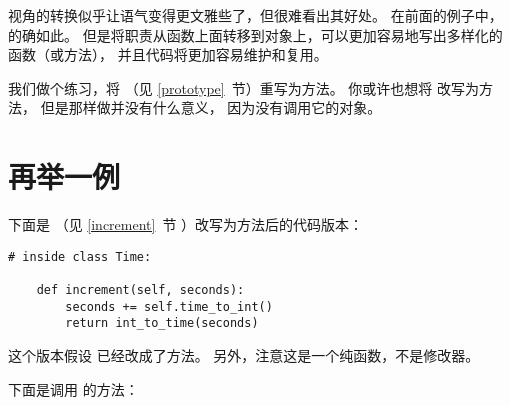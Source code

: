 
视角的转换似乎让语气变得更文雅些了，但很难看出其好处。
在前面的例子中，的确如此。
但是将职责从函数上面转移到对象上，可以更加容易地写出多样化的函数（或方法），
并且代码将更加容易维护和复用。


我们做个练习，将  （见 \ref{prototype}~节）重写为方法。
你或许也想将  改写为方法， 但是那样做并没有什么意义， 因为没有调用它的对象。

\section{再举一例}


下面是  （见 \ref{increment}~节 ）改写为方法后的代码版本：

\begin{lstlisting}
# inside class Time:

    def increment(self, seconds):
        seconds += self.time_to_int()
        return int_to_time(seconds)
\end{lstlisting}

%

这个版本假设  已经改成了方法。  另外，注意这是一个纯函数，不是修改器。


下面是调用  的方法：

